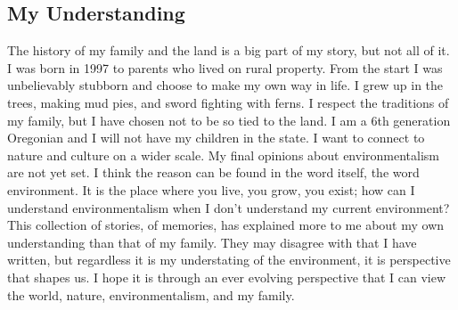 \documentclass[
    a4paper,
    12pt,
    man,
    donotrepeattitle
]{apa6}
\begin{document}
\subsection{My Understanding}

The history of my family and the land is a big part of my story, but not all of
it. I was born in 1997 to parents who lived on rural property. From the start
I was unbelievably stubborn and choose to make my own way in life. I grew up in
the trees, making mud pies, and sword fighting with ferns. I respect the
traditions of my family, but I have chosen not to be so tied to the land. I am
a 6th generation Oregonian and I will not have my children in the state. I want
to connect to nature and culture on a wider scale. My final opinions about
environmentalism are not yet set. I think the reason can be found in the word
itself, the word environment. It is the place where you live, you grow, you
exist; how can I understand environmentalism when I don't understand my current
environment? This collection of stories, of memories, has explained more to me
about my own understanding than that of my family. They may disagree with that
I have written, but regardless it is my understating of the environment, it is
perspective that shapes us. I hope it is through an ever evolving perspective
that I can view the world, nature, environmentalism, and my family.

\printbibliography{}
\end{document}
